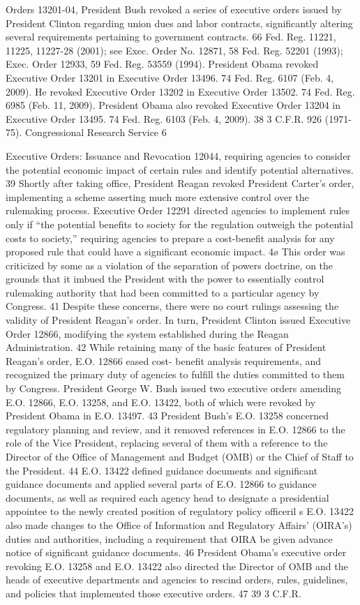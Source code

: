 \documentclass[11pt,a4paper]{article}
\begin{document}
Orders 13201-04, President Bush revoked a series of executive orders issued by President Clinton regarding union dues and labor contracts, significantly altering several requirements pertaining to government contracts. 66 Fed. Reg. 11221, 11225, 11227-28 (2001); see Exec. Order No. 12871, 58 Fed. Reg. 52201 (1993); Exec. Order 12933, 59 Fed. Reg. 53559 (1994). President Obama revoked Executive Order 13201 in Executive Order 13496. 74 Fed. Reg. 6107 (Feb. 4, 2009). He revoked Executive Order 13202 in Executive Order 13502. 74 Fed. Reg. 6985 (Feb. 11, 2009). President Obama also revoked Executive Order 13204 in Executive Order 13495. 74 Fed. Reg. 6103 (Feb. 4, 2009). 38 3 C.F.R. 926 (1971-75). Congressional Research Service 6

Executive Orders: Issuance and Revocation 12044, requiring agencies to consider the potential economic impact of certain rules and identify potential alternatives. 39 Shortly after taking office, President Reagan revoked President Carter's order, implementing a scheme asserting much more extensive control over the rulemaking process. Executive Order 12291 directed agencies to implement rules only if “the potential benefits to society for the regulation outweigh the potential costs to society,” requiring agencies to prepare a cost-benefit analysis for any proposed rule that could have a significant economic impact. 4ø This order was criticized by some as a violation of the separation of powers doctrine, on the grounds that it imbued the President with the power to essentially control rulemaking authority that had been committed to a particular agency by Congress. 41 Despite these concerns, there were no court rulings assessing the validity of President Reagan's order. In turn, President Clinton issued Executive Order 12866, modifying the system established during the Reagan Administration. 42 While retaining many of the basic features of President Reagan's order, E.O. 12866 eased cost- benefit analysis requirements, and recognized the primary duty of agencies to fulfill the duties committed to them by Congress. President George W. Bush issued two executive orders amending E.O. 12866, E.O. 13258, and E.O. 13422, both of which were revoked by President Obama in E.O. 13497. 43 President Bush's E.O. 13258 concerned regulatory planning and review, and it removed references in E.O. 12866 to the role of the Vice President, replacing several of them with a reference to the Director of the Office of Management and Budget (OMB) or the Chief of Staff to the President. 44 E.O. 13422 defined guidance documents and significant guidance documents and applied several parts of E.O. 12866 to guidance documents, as well as required each agency head to designate a presidential appointee to the newly created position of regulatory policy officeril s E.O. 13422 also made changes to the Office of Information and Regulatory Affairs' (OIRA's) duties and authorities, including a requirement that OIRA be given advance notice of significant guidance documents. 46 President Obama's executive order revoking E.O. 13258 and E.O. 13422 also directed the Director of OMB and the heads of executive departments and agencies to rescind orders, rules, guidelines, and policies that implemented those executive orders. 47 39 3 C.F.R. 
\end{document}

